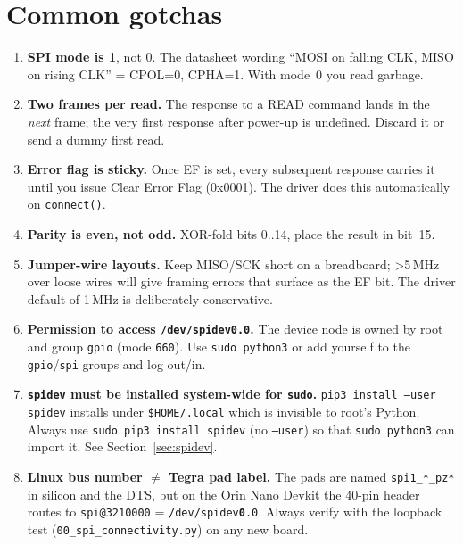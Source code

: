 \documentclass[11pt,a4paper]{article}
\begin{document}
\section{Common gotchas}
\begin{enumerate}
  \item \textbf{SPI mode is 1}, not 0.  The datasheet wording ``MOSI on
        falling CLK, MISO on rising CLK'' = CPOL=0, CPHA=1.  With mode~0
        you read garbage.
  \item \textbf{Two frames per read.}  The response to a READ command
        lands in the \emph{next} frame; the very first response after
        power-up is undefined.  Discard it or send a dummy first read.
  \item \textbf{Error flag is sticky.}  Once EF is set, every subsequent
        response carries it until you issue Clear Error Flag (0x0001).
        The driver does this automatically on \texttt{connect()}.
  \item \textbf{Parity is even, not odd.}  XOR-fold bits 0..14, place
        the result in bit~15.
  \item \textbf{Jumper-wire layouts.}  Keep MISO/SCK short on a
        breadboard; >5\,MHz over loose wires will give framing errors
        that surface as the EF bit.  The driver default of 1\,MHz is
        deliberately conservative.
  \item \textbf{Permission to access \texttt{/dev/spidev0.0}.}  The
        device node is owned by root and group \texttt{gpio} (mode
        \texttt{660}).  Use \texttt{sudo python3} or add yourself to
        the \texttt{gpio}/\texttt{spi} groups and log out/in.
  \item \textbf{\texttt{spidev} must be installed system-wide for
        \texttt{sudo}.}  \texttt{pip3 install --user spidev} installs
        under \texttt{\$HOME/.local} which is invisible to root's
        Python.  Always use \texttt{sudo pip3 install spidev} (no
        \texttt{--user}) so that \texttt{sudo python3} can import it.
        See Section~\ref{sec:spidev}.
  \item \textbf{Linux bus number $\ne$ Tegra pad label.}  The pads are
        named \texttt{spi1\_*\_pz*} in silicon and the DTS, but on the
        Orin Nano Devkit the 40-pin header routes to
        \texttt{spi@3210000} = \texttt{/dev/spidev\textbf{0}.0}.
        Always verify with the loopback test
        (\texttt{00\_spi\_connectivity.py}) on any new board.
\end{enumerate}
\end{document}
